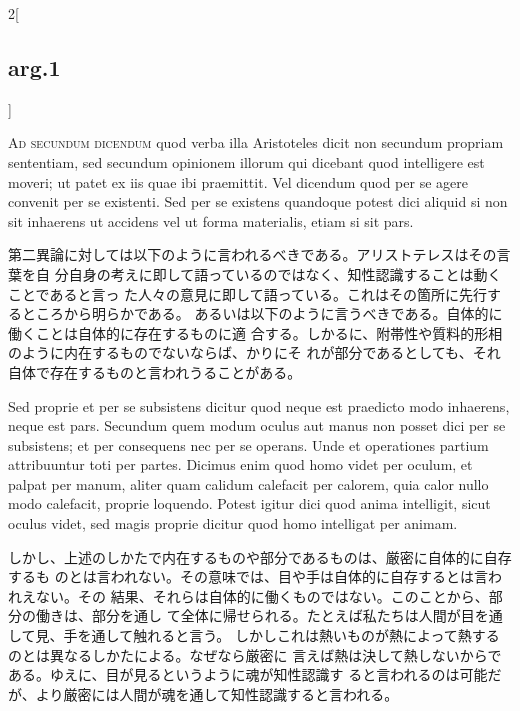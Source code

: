 \documentclass[paper=a4paper,fontsize=10pt,jafontsize=9pt,titlepage]{jlreq}
\begin{document}
\begin{paracol}{2}[\subsection{arg.1}]
\switchcolumn*[\subsection{ad 2}]

 {\scshape Ad secundum dicendum} quod verba illa Aristoteles dicit non secundum
 propriam sententiam, sed secundum opinionem illorum qui dicebant quod
 intelligere est moveri; ut patet ex iis quae ibi praemittit. Vel dicendum quod
 per se agere convenit per se existenti. Sed per se existens quandoque potest
 dici aliquid si non sit inhaerens ut accidens vel ut forma materialis, etiam si
 sit pars.

\switchcolumn

 第二異論に対しては以下のように言われるべきである。アリストテレスはその言葉を自
 分自身の考えに即して語っているのではなく、知性認識することは動くことであると言っ
 た人々の意見に即して語っている。これはその箇所に先行するところから明らかである。
 あるいは以下のように言うべきである。自体的に働くことは自体的に存在するものに適
 合する。しかるに、附帯性や質料的形相のように内在するものでないならば、かりにそ
 れが部分であるとしても、それ自体で存在するものと言われうることがある。

\switchcolumn*

 Sed proprie et per se subsistens dicitur quod neque est praedicto modo
 inhaerens, neque est pars. Secundum quem modum oculus aut manus non posset dici
 per se subsistens; et per consequens nec per se operans. Unde et operationes
 partium attribuuntur toti per partes. Dicimus enim quod homo videt per oculum,
 et palpat per manum, aliter quam calidum calefacit per calorem, quia calor
 nullo modo calefacit, proprie loquendo. Potest igitur dici quod anima
 intelligit, sicut oculus videt, sed magis proprie dicitur quod homo intelligat
 per animam.

 \switchcolumn

 しかし、上述のしかたで内在するものや部分であるものは、厳密に自体的に自存するも
 のとは言われない。その意味では、目や手は自体的に自存するとは言われえない。その
 結果、それらは自体的に働くものではない。このことから、部分の働きは、部分を通し
 て全体に帰せられる。たとえば私たちは人間が目を通して見、手を通して触れると言う。
 しかしこれは熱いものが熱によって熱するのとは異なるしかたによる。なぜなら厳密に
 言えば熱は決して熱しないからである。ゆえに、目が見るというように魂が知性認識す
 ると言われるのは可能だが、より厳密には人間が魂を通して知性認識すると言われる。

\switchcolumn*[\subsection{ad 3}]


\end{paracol}
\end{document}

